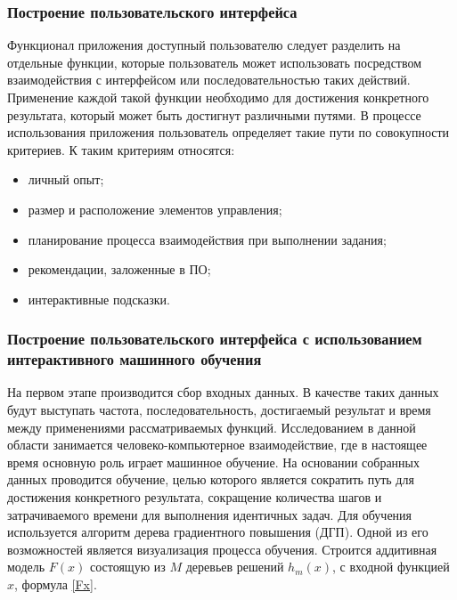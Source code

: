 \def\notedate{2022.10.13}
\def\currentauthor{Василян А.Р. (РК6-73Б)}

\subsubsection{Построение пользовательского интерфейса}
	Функционал приложения доступный пользователю следует разделить на отдельные функции, которые пользователь может использовать посредством взаимодействия с интерфейсом или последовательностью таких действий. Применение каждой такой функции необходимо для достижения конкретного результата, который может быть достигнут различными путями. В процессе использования приложения пользователь определяет такие пути по совокупности критериев. К таким критериям относятся:

\begin{itemize}
	\item личный опыт; 
	\item размер и расположение элементов управления;
	\item планирование процесса взаимодействия при выполнении задания;
	\item рекомендации, заложенные в ПО; 
	\item интерактивные подсказки.
\end{itemize}

\subsubsection{Построение пользовательского интерфейса с использованием интерактивного машинного обучения}
	На первом этапе производится сбор входных данных. В качестве таких данных будут выступать частота, последовательность, достигаемый результат и время между применениями рассматриваемых функций. Исследованием в данной области занимается человеко-компьютерное взаимодействие, где в настоящее время основную роль играет машинное обучение.
	На основании собранных данных проводится обучение, целью которого является сократить путь для достижения конкретного результата, сокращение количества шагов и затрачиваемого времени для выполнения идентичных задач. Для обучения используется алгоритм дерева градиентного повышения (ДГП). Одной из его возможностей является визуализация процесса обучения. Строится аддитивная модель $F(x)$ состоящую из $M$ деревьев решений $h_m(x)$, с входной функцией $x$, формула  \ref{Fx}.

